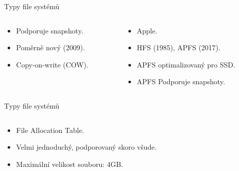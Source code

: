 \documentclass[aspectratio=169,xcolor=dvipsnames, t]{beamer}
\begin{document}
{\begin{frame}{Typy file systémů}
\begin{columns}
    \begin{column}{0.45\textwidth}
        \begin{itemize}
            \item Podporuje snapshoty.
            \item Poměrně nový (2009).
            \item Copy-on-write (COW).
        \end{itemize}
    \end{column}
    \begin{column}{0.45\textwidth}  %
        \begin{itemize}
            \item Apple.
            \item HFS (1985), APFS (2017).
            \item APFS optimalizovaný pro SSD.
            \item APFS Podporuje snapshoty.
        \end{itemize}
    \end{column}
    \end{columns}
\end{frame}
\begin{frame}{Typy file systémů}
    \begin{columns}
    \begin{column}{0.45\textwidth}
        \begin{itemize}
            \item File Allocation Table.
            \item Velmi jednoduchý, podporovaný skoro všude.
            \item Maximální velikost souboru: 4GB.


\end{itemize}
\end{column}
\end{columns}
\end{frame}}
\end{document}
